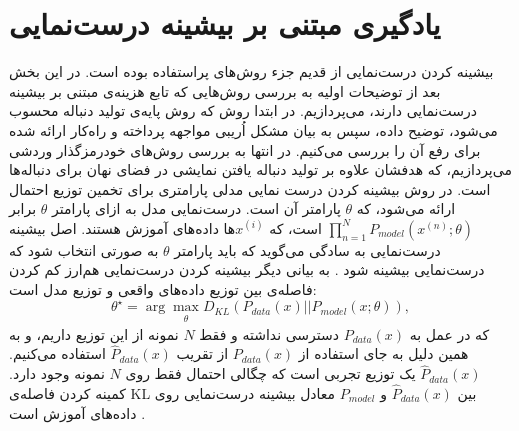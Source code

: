  \section{یادگیری مبتنی بر بیشینه درست‌نمایی}
 بیشینه کردن درست‌نمایی از قدیم جزء روش‌های پراستفاده بوده است. در این بخش بعد از توضیحات اولیه  به بررسی روش‌هایی که تابع هزینه‌ی مبتنی بر بیشینه درست‌نمایی دارند، می‌پردازیم. در ابتدا روش
که روش پایه‌ی تولید دنباله محسوب می‌شود، توضیح داده، سپس به بیان مشکل  اُریبی مواجهه  پرداخته و راه‌کار ارائه شده برای رفع آن را بررسی می‌کنیم. در انتها به بررسی روش‌های خودرمزگذار وردشی می‌پردازیم، که هدفشان علاوه بر تولید دنباله یافتن نمایشی در فضای نهان برای دنباله‌ها است.
 \newline
در روش بیشینه کردن  درست نمایی مدلی پارامتری برای تخمین توزیع احتمال ارائه می‌شود، که $\theta$ پارامتر آن است. درست‌نمایی مدل به ازای پارامتر $\theta$ برابر 
 $\prod_{n=1}^{N}P_{model}(x^{(n)};\theta)$
 است، که  $x^{(i)}$ها داده‌های آموزش هستند.
 اصل بیشینه درست‌نمایی به سادگی می‌گوید که باید پارامتر $\theta$ به صورتی انتخاب شود که درست‌نمایی بیشینه
 شود \cite{goodfellow2016nips}.
 \newline
 به بیانی دیگر بیشینه کردن درست‌نمایی هم‌ارز کم کردن فاصله‌ی 
 بین توزیع داده‌های واقعی و توزیع مدل است:
 \begin{equation}
 \theta^\star = \arg \max_{\substack{\theta}} D_{KL}(P_{data}(x) || P_{model}(x;\theta)) ,
 \end{equation}
 که در عمل به $P_{data}(x)$ دسترسی نداشته و فقط $N$ نمونه از این توزیع داریم، و به همین دلیل به جای استفاده از $P_{data}(x)$ از تقریب $\hat{P}_{data}(x)$  استفاده می‌کنیم.
 $\hat{P}_{data}(x)$
  یک توزیع تجربی است که چگالی احتمال فقط روی $N$ نمونه‌ وجود دارد. کمینه کردن فاصله‌ی KL بین 
 $\hat{P}_{data}(x)$
 و 
 $P_{model}$
 معادل بیشینه درست‌نمایی روی داده‌های آموزش است \cite{goodfellow2016nips}.
